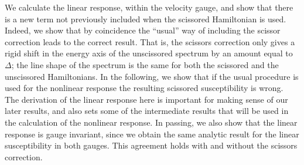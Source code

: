 \documentclass[floatfix,prb,aps,superscriptaddress,11pt]{revtex4}
\begin{document}
We calculate the linear response, within the velocity gauge, and show that
there is a new term not previously included when the scissored Hamiltonian
is used. 
Indeed, we show that by coincidence the 
``usual'' way of including the scissor correction leads to
the correct result. 
That is, the scissors correction only gives a rigid
shift in the energy axis of the unscissored spectrum by an amount equal to 
$\Delta$; the line shape of the spectrum is the same for both the scissored and
the unscissored
Hamiltonians.\cite{nastosPRB05,solePRB93,levinePRB91,levinePRL89} 
In the following, we show
that if the usual procedure is used
for the nonlinear response the resulting 
scissored susceptibility is wrong.
The derivation of
the linear response here is important for making sense of our later results,
and also sets some of the intermediate results that will be used in the
calculation of the nonlinear response. 
In passing, we also show that the linear response is gauge invariant, since we 
obtain the same analytic result for the linear susceptibility in both gauges.
This agreement holds with and without the scissors correction.
\end{document}
